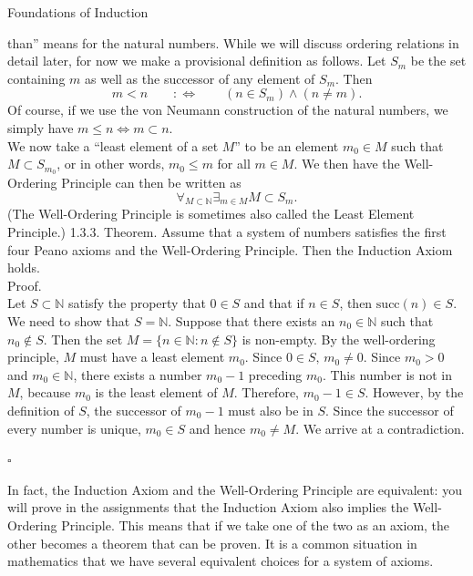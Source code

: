 \documentclass[smaller,hyperref={CJKbookmarks=true}]{beamer}
\newcommand{\N}{\mathbb{N}} \newcommand{\Z}{\mathbb{Z}} \newcommand{\Q}{\mathbb{Q}}
\begin{document}
\begin{frame}{Foundations of Induction}
\begin{spacing}{1.05}
than'' means for the natural numbers. While we will discuss ordering
relations in detail later, for now we make a provisional definition as follows.
\newpage
Let $S_m$ be the set containing $m$ as well as the successor of any element of $S_m$. Then
\[m<n\qquad:\Leftrightarrow\qquad
(n\in S_m)\wedge(n\neq m).\]
Of course, if we use the von Neumann construction of the natural
numbers, we simply have $m\leq n\Leftrightarrow m\subset n$.\\[5pt]
We now take a ``least element of a set $M$'' to be an element $m_0\in M$ such that $M\subset S_{m_0}$, or in other words, $m_0\leq m$ for all $m\in M$. We then have the Well-Ordering Principle can then be written as
\[\mathop{\forall}_{M\subset\N}\mathop{\exists}
_{m\in M}M\subset S_m.\]
(The Well-Ordering Principle is sometimes also called the Least Element
Principle.)
\newpage
\alert{1.3.3. Theorem.} Assume that a system of numbers satisfies the first four
Peano axioms and the Well-Ordering Principle. Then the Induction Axiom
holds.\\[6pt]
\alert{Proof.}\\
Let $S\subset\N$ satisfy the property that $0\in S$ and that if $n\in S$, then $\text{succ}(n)\in S$. We need to show that $S=\N$. Suppose that there exists an $n_0\in\N$ such that $n_0\notin S$. Then the set $M=\{n\in\N\!:n\notin S\}$ is non-empty. By the well-ordering principle, $M$ must have a least element $m_0$. Since $0\in S,\,m_0\neq0$. Since $m_0>0$ and $m_0\in\N$, there exists a number $m_0-1$ preceding $m_0$. This number is not in $M$, because $m_0$ is the least element of $M$. Therefore, $m_0-1\in S$. However, by the definition of $S$, the successor of $m_0-1$ must also be in $S$. Since the successor of every number is unique, $m_0\in S$ and hence $m_0\neq M$. We arrive at a contradiction.
\begin{flushright}
  $\square$
\end{flushright}
\newpage
\vspace*{30pt}
In fact, the Induction Axiom and the Well-Ordering Principle are
equivalent: you will prove in the assignments that the Induction Axiom
also implies the Well-Ordering Principle. This means that if we take one of
the two as an axiom, the other becomes a theorem that can be proven. It
is a common situation in mathematics that we have several equivalent
choices for a system of axioms.
\end{spacing}
\end{frame}
\end{document}

